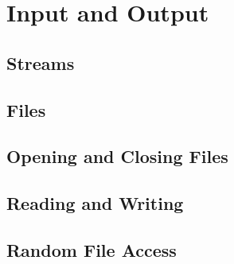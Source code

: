 \section{Input and Output}

\subsection{Streams}
\subsection{Files}
\subsection{Opening and Closing Files}
\subsection{Reading and Writing}
\subsection{Random File Access}